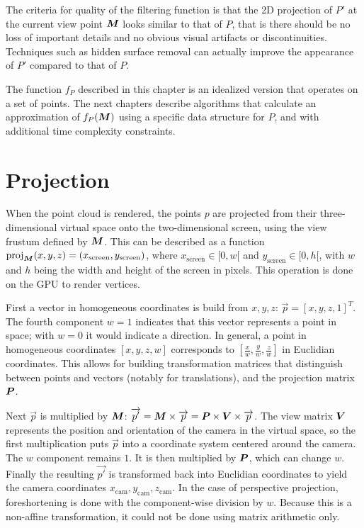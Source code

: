 \documentclass[a4paper,11pt,abstracton,notitlepage]{scrreprt}
\begin{document}
The criteria for quality of the filtering function is that the 2D projection of $P'$ at the current view point $\matrixsym{M}$ looks similar to that of $P$, that is there should be no loss of important details and no obvious visual artifacts or discontinuities. Techniques such as hidden surface removal can actually improve the appearance of $P'$ compared to that of $P$.

The function $f_{P}$ described in this chapter is an idealized version that operates on a set of points. The next chapters describe algorithms that calculate an approximation of $f_{P}(\matrixsym{M})$ using a specific data structure for $P$, and with additional time complexity constraints.


\section{Projection}
When the point cloud is rendered, the points $p$ are projected from their three-dimensional virtual space onto the two-dimensional screen, using the view frustum defined by $\matrixsym{M}$. This can be described as a function $\mathrm{proj}_{\matrixsym{M}}(x, y, z) = (x_{\mathrm{screen}}, y_{\mathrm{screen}})$, where $x_{\mathrm{screen}} \in [0, w[$ and $y_{\mathrm{screen}} \in [0, h[$, with $w$ and $h$ being the width and height of the screen in pixels. This operation is done on the GPU to render vertices.

First a vector in homogeneous coordinates is build from $x, y, z$: $\overrightarrow{p} = [x, y, z, 1]^{T}$. The fourth component $w = 1$ indicates that this vector represents a point in space; with $w = 0$ it would indicate a direction. In general, a point in homogeneous coordinates $[x, y, z, w]$ corresponds to $[\frac{x}{w}, \frac{y}{w}, \frac{z}{w}]$ in Euclidian coordinates. This allows for building transformation matrices that distinguish between points and vectors (notably for translations), and the projection matrix $\matrixsym{P}$.

Next $\overrightarrow{p}$ is multiplied by $\matrixsym{M}$: $\overrightarrow{p'} = \matrixsym{M} \times \overrightarrow{p} = \matrixsym{P} \times \matrixsym{V} \times \overrightarrow{p}$. The view matrix $\matrixsym{V}$ represents the position and orientation of the camera in the virtual space, so the first multiplication puts $\overrightarrow{p}$ into a coordinate system centered around the camera. The $w$ component remains $1$. It is then multiplied by $\matrixsym{P}$, which can change $w$. Finally the resulting $\overrightarrow{p'}$ is transformed back into Euclidian coordinates to yield the camera coordinates $x_{\mathrm{cam}}, y_{\mathrm{cam}}, z_{\mathrm{cam}}$. In the case of perspective projection, foreshortening is done with the component-wise division by $w$. Because this is a non-affine transformation, it could not be done using matrix arithmetic only.
\end{document}
